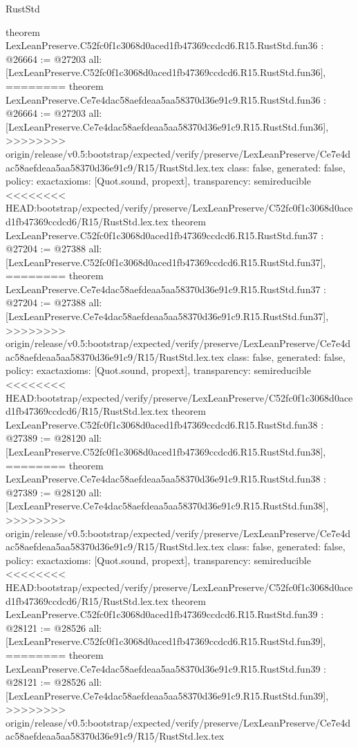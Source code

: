 \begin{lexlean}{RustStd}
\begin{coremodule}
{\begin{coremodule}
{{{{{{{{{{{{{{{{{{{{{{{{{{{{{{{{{{{{{{theorem LexLeanPreserve.C52fc0f1c3068d0aced1fb47369ccdcd6.R15.RustStd.fun36 : @26664 := @27203 {
  all: [LexLeanPreserve.C52fc0f1c3068d0aced1fb47369ccdcd6.R15.RustStd.fun36],
========
theorem LexLeanPreserve.Ce7e4dac58aefdeaa5aa58370d36e91c9.R15.RustStd.fun36 : @26664 := @27203 {
  all: [LexLeanPreserve.Ce7e4dac58aefdeaa5aa58370d36e91c9.R15.RustStd.fun36],
>>>>>>>> origin/release/v0.5:bootstrap/expected/verify/preserve/LexLeanPreserve/Ce7e4dac58aefdeaa5aa58370d36e91c9/R15/RustStd.lex.tex
  class: false,
  generated: false,
  policy: exact{axioms: [Quot.sound, propext]},
  transparency: semireducible
}
<<<<<<<< HEAD:bootstrap/expected/verify/preserve/LexLeanPreserve/C52fc0f1c3068d0aced1fb47369ccdcd6/R15/RustStd.lex.tex
theorem LexLeanPreserve.C52fc0f1c3068d0aced1fb47369ccdcd6.R15.RustStd.fun37 : @27204 := @27388 {
  all: [LexLeanPreserve.C52fc0f1c3068d0aced1fb47369ccdcd6.R15.RustStd.fun37],
========
theorem LexLeanPreserve.Ce7e4dac58aefdeaa5aa58370d36e91c9.R15.RustStd.fun37 : @27204 := @27388 {
  all: [LexLeanPreserve.Ce7e4dac58aefdeaa5aa58370d36e91c9.R15.RustStd.fun37],
>>>>>>>> origin/release/v0.5:bootstrap/expected/verify/preserve/LexLeanPreserve/Ce7e4dac58aefdeaa5aa58370d36e91c9/R15/RustStd.lex.tex
  class: false,
  generated: false,
  policy: exact{axioms: [Quot.sound, propext]},
  transparency: semireducible
}
<<<<<<<< HEAD:bootstrap/expected/verify/preserve/LexLeanPreserve/C52fc0f1c3068d0aced1fb47369ccdcd6/R15/RustStd.lex.tex
theorem LexLeanPreserve.C52fc0f1c3068d0aced1fb47369ccdcd6.R15.RustStd.fun38 : @27389 := @28120 {
  all: [LexLeanPreserve.C52fc0f1c3068d0aced1fb47369ccdcd6.R15.RustStd.fun38],
========
theorem LexLeanPreserve.Ce7e4dac58aefdeaa5aa58370d36e91c9.R15.RustStd.fun38 : @27389 := @28120 {
  all: [LexLeanPreserve.Ce7e4dac58aefdeaa5aa58370d36e91c9.R15.RustStd.fun38],
>>>>>>>> origin/release/v0.5:bootstrap/expected/verify/preserve/LexLeanPreserve/Ce7e4dac58aefdeaa5aa58370d36e91c9/R15/RustStd.lex.tex
  class: false,
  generated: false,
  policy: exact{axioms: [Quot.sound, propext]},
  transparency: semireducible
}
<<<<<<<< HEAD:bootstrap/expected/verify/preserve/LexLeanPreserve/C52fc0f1c3068d0aced1fb47369ccdcd6/R15/RustStd.lex.tex
theorem LexLeanPreserve.C52fc0f1c3068d0aced1fb47369ccdcd6.R15.RustStd.fun39 : @28121 := @28526 {
  all: [LexLeanPreserve.C52fc0f1c3068d0aced1fb47369ccdcd6.R15.RustStd.fun39],
========
theorem LexLeanPreserve.Ce7e4dac58aefdeaa5aa58370d36e91c9.R15.RustStd.fun39 : @28121 := @28526 {
  all: [LexLeanPreserve.Ce7e4dac58aefdeaa5aa58370d36e91c9.R15.RustStd.fun39],
>>>>>>>> origin/release/v0.5:bootstrap/expected/verify/preserve/LexLeanPreserve/Ce7e4dac58aefdeaa5aa58370d36e91c9/R15/RustStd.lex.tex
}}}}}}}}}}}}}}}}}}}}}}}}}}}}}}}}}}}}}}}}}}}
\end{coremodule}}
\end{coremodule}
\end{lexlean}
